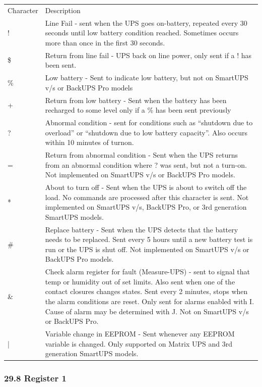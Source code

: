 \begin{longtable}{ll}
{Character} & {Description 
 } \\
{!} & {Line Fail - sent when the UPS goes on-battery, repeated every 30
seconds until low battery condition reached. Sometimes occurs more than once
in the first 30 seconds. 
 } \\
{\$} & {Return from line fail - UPS back on line power, only sent if a ! has
been sent. 
 } \\
{\%} & {Low battery - Sent to indicate low battery, but not on SmartUPS v/s or
BackUPS Pro models 
 } \\
{+} & {Return from low battery - Sent when the battery has been recharged to
some level only if a \% has been sent previously 
 } \\
{?} & {Abnormal condition - sent for conditions such as ``shutdown due to
overload'' or ``shutdown due to low battery capacity''. Also occurs within 10
minutes of turnon. 
 } \\
{=} & {Return from abnormal condition - Sent when the UPS returns from an
abnormal condition where ? was sent, but not a turn-on. Not implemented on
SmartUPS v/s or BackUPS Pro models. 
 } \\
{*} & {About to turn off - Sent when the UPS is about to switch off the load.
No commands are processed after this character is sent. Not implemented on
SmartUPS v/s, BackUPS Pro, or 3rd generation SmartUPS models. 
 } \\
{\#} & {Replace battery - Sent when the UPS detects that the battery needs to
be replaced. Sent every 5 hours until a new battery test is run or the UPS is
shut off. Not implemented on SmartUPS v/s or BackUPS Pro models. 
 } \\
{\&} & {Check alarm register for fault (Measure-UPS) - sent to signal that
temp or humidity out of set limits. Also sent when one of the contact closures
changes states. Sent every 2 minutes, stops when the alarm conditions are
reset. Only sent for alarms enabled with I. Cause of alarm may be determined
with J. Not on SmartUPS v/s or BackUPS Pro. 
 } \\
{|} & {Variable change in EEPROM - Sent whenever any EEPROM variable is
changed. Only supported on Matrix UPS and 3rd generation SmartUPS models.  
}

\end{longtable}

\label{Register-1}

\subsubsection*{29.8 Register 1}

